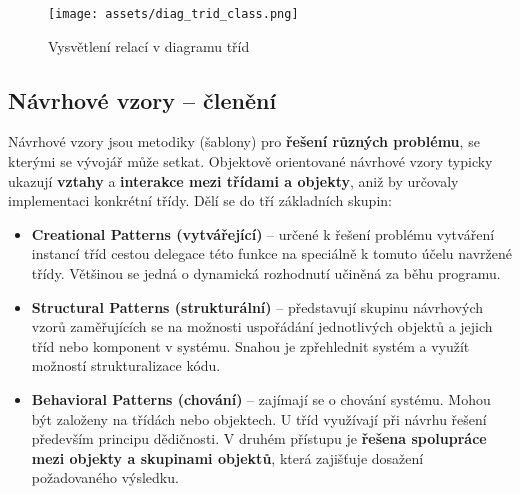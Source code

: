 \begin{figure}[H]
	\centering
	\texttt{[image: assets/diag\_trid\_class.png]}
	\caption{Vysvětlení relací v diagramu tříd}
\end{figure}

\subsection{Návrhové vzory -- členění}
Návrhové vzory jsou metodiky (šablony) pro \textbf{řešení různých problému}, se kterými se vývojář může setkat. Objektově orientované návrhové vzory typicky ukazují \textbf{vztahy} a \textbf{interakce mezi třídami a objekty}, aniž by určovaly implementaci konkrétní třídy. Dělí se do tří základních skupin:
\begin{itemize}
\item \textbf{Creational Patterns (vytvářející)} -- určené k řešení problému vytváření instancí tříd cestou delegace této funkce na speciálně k tomuto účelu navržené třídy. Většinou se jedná o dynamická rozhodnutí učiněná za běhu programu.
\item \textbf{Structural Patterns (strukturální)} -- představují skupinu návrhových vzorů zaměřujících se na možnosti uspořádání jednotlivých objektů a jejich tříd nebo komponent v systému. Snahou je zpřehlednit systém a využít možností strukturalizace kódu.
\item \textbf{Behavioral Patterns (chování)} -- zajímají se o chování systému. Mohou být založeny na třídách nebo objektech. U tříd využívají při návrhu řešení především principu dědičnosti. V druhém přístupu je \textbf{řešena spolupráce mezi objekty a skupinami objektů}, která zajišťuje dosažení požadovaného výsledku.
\end{itemize}

